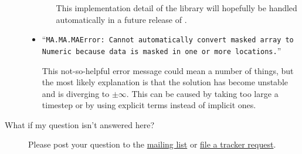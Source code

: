 \begin{description}
\begin{itemize}
\begin{enumerate}
                This implementation detail of the \Numeric{} library
                will hopefully be handled automatically in a future
                release of \FiPy{}.

            \end{enumerate}
            
            \item ``\texttt{MA.MA.MAError: Cannot automatically
            convert masked array to Numeric because data is masked in one or
            more locations.}''
            
            This not-so-helpful error message could mean a number of things,
            but the most likely explanation is that the solution has become
            unstable and is diverging to $\pm\infty$.  This can be caused by
            taking too large a timestep or by using explicit terms instead of
            implicit ones.
            
        \end{itemize}

    \item[What if my question isn't answered here?]  
        
        Please post your question to the 
        \href{http://www.ctcms.nist.gov/fipy/mail.html}{mailing list} or 
        \href{http://sourceforge.net/tracker/?group_id=118428}{file a tracker request}.
    

\end{description}
